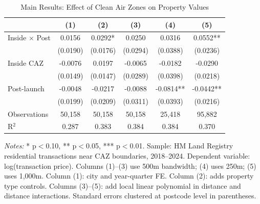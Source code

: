 \begin{table}
\centering
\caption{Main Results: Effect of Clean Air Zones on Property Values\label{tab:main}}
\centering
\begin{tabular}[t]{lccccc}
\toprule
  & (1) & (2) & (3) & (4) & (5)\\
\midrule
Inside $\times$ Post & 0.0156 & 0.0292* & 0.0250 & 0.0316 & 0.0552**\\
 & (0.0190) & (0.0176) & (0.0294) & (0.0388) & (0.0236)\\
Inside CAZ & -0.0076 & 0.0197 & -0.0065 & -0.0182 & -0.0290\\
 & (0.0149) & (0.0147) & (0.0289) & (0.0398) & (0.0218)\\
Post-launch & -0.0048 & -0.0217 & -0.0088 & -0.0814** & -0.0442**\\
 & (0.0199) & (0.0209) & (0.0311) & (0.0393) & (0.0216)\\
\midrule
Observations & 50,158 & 50,158 & 50,158 & 25,418 & 95,882\\
R$^2$ & 0.287 & 0.383 & 0.384 & 0.384 & 0.370\\
\bottomrule
\end{tabular}
\vspace{0.5em}
\begin{minipage}{0.95\textwidth}
\footnotesize
\textit{Notes:} * p$<$0.10, ** p$<$0.05, *** p$<$0.01. Sample: HM Land Registry residential transactions near CAZ boundaries, 2018--2024. Dependent variable: log(transaction price). Columns (1)--(3) use 500m bandwidth; (4) uses 250m; (5) uses 1,000m. Column (1): city and year-quarter FE. Column (2): adds property type controls. Columns (3)--(5): add local linear polynomial in distance and distance interactions. Standard errors clustered at postcode level in parentheses.
\end{minipage}
\end{table}
